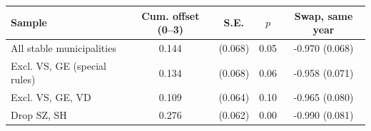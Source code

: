 \begin{tabular}{lcccc}
\toprule
Sample & Cum. offset (0--3) & S.E. & $p$ & Swap, same year \\
\midrule
All stable municipalities & 0.144 & (0.068) & 0.05 & -0.970 (0.068) \\
Excl. VS, GE (special rules) & 0.134 & (0.068) & 0.06 & -0.958 (0.071) \\
Excl. VS, GE, VD & 0.109 & (0.064) & 0.10 & -0.965 (0.080) \\
Drop SZ, SH & 0.276 & (0.062) & 0.00 & -0.990 (0.081) \\
\bottomrule
\end{tabular}